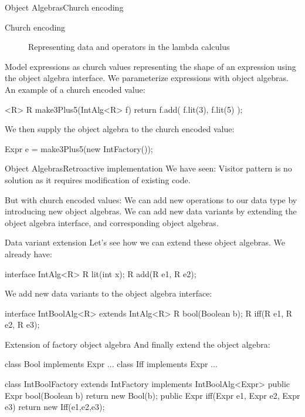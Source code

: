 \documentclass[10pt, compress]{beamer}
\newenvironment{slide}[1]{\begin{frame}[fragile,environment=slide]{#1}}{\end{frame}}
\newenvironment{slide}[2]{\begin{frame}[fragile,environment=slide]{#1}{#2}}{\end{frame}}
\begin{document}
\begin{slide}{Object Algebras}{Church encoding}
\begin{description}
\item[Church encoding] Representing data and operators in the lambda calculus %
\end{description}

Model expressions as church values representing the shape of an expression using the object algebra interface.
We parameterize expressions with object algebras.%
An example of a church encoded value:
\begin{java}
<R> R make3Plus5(IntAlg<R> f) {
  return f.add( f.lit(3), f.lit(5) );
}
\end{java}
We then supply the object algebra to the church encoded value:
\begin{java}
Expr e = make3Plus5(new IntFactory());
\end{java}
\end{slide}

\begin{slide}{Object Algebras}{Retroactive implementation}
We have seen:
  Visitor pattern is no solution as it requires modification of existing code.

But with church encoded values:
We can add new operations to our data type by introducing new object algebras.
We can add new data variants by extending the object algebra interface, and corresponding object algebras.
\end{slide}


\begin{slide}{Data variant extension}
Let's see how we can extend these object algebras.
We already have:
\begin{java}
interface IntAlg<R> {
  R lit(int x);
  R add(R e1, R e2);
}
\end{java}
We add new data variants to the object algebra interface:
\begin{java}
interface IntBoolAlg<R> extends IntAlg<R> {
  R bool(Boolean b);
  R iff(R e1, R e2, R e3);
}
\end{java}
\end{slide}

\begin{slide}{Extension of factory object algebra}
And finally extend the object algebra:
\begin{java}
class Bool implements Expr {...}
class Iff implements Expr {...}

class IntBoolFactory extends IntFactory 
                     implements IntBoolAlg<Expr> {
  public Expr bool(Boolean b) {
    return new Bool(b);
  }
  public Expr iff(Expr e1, Expr e2, Expr e3) {
    return new Iff(e1,e2,e3);
  }
}
\end{java}
\end{slide}
\end{document}
